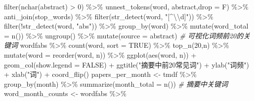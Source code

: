 \documentclass[]{tufte-book}
\newenvironment{Shaded}{}{}
\newcommand{\AttributeTok}[1]{\textcolor[rgb]{0.49,0.56,0.16}{#1}}
\newcommand{\CommentTok}[1]{\textcolor[rgb]{0.38,0.63,0.69}{\textit{#1}}}
\newcommand{\ConstantTok}[1]{\textcolor[rgb]{0.53,0.00,0.00}{#1}}
\newcommand{\DecValTok}[1]{\textcolor[rgb]{0.25,0.63,0.44}{#1}}
\newcommand{\FunctionTok}[1]{\textcolor[rgb]{0.02,0.16,0.49}{#1}}
\newcommand{\NormalTok}[1]{#1}
\newcommand{\OtherTok}[1]{\textcolor[rgb]{0.00,0.44,0.13}{#1}}
\newcommand{\SpecialCharTok}[1]{\textcolor[rgb]{0.25,0.44,0.63}{#1}}
\newcommand{\StringTok}[1]{\textcolor[rgb]{0.25,0.44,0.63}{#1}}
\begin{document}
\begin{Shaded}
\begin{Highlighting}[]
        \FunctionTok{filter}\NormalTok{(}\FunctionTok{nchar}\NormalTok{(abstract) }\SpecialCharTok{\textgreater{}} \DecValTok{0}\NormalTok{) }\SpecialCharTok{\%\textgreater{}\%}
        \FunctionTok{unnest\_tokens}\NormalTok{(word, abstract,}\AttributeTok{drop =}\NormalTok{ F) }\SpecialCharTok{\%\textgreater{}\%}
        \FunctionTok{anti\_join}\NormalTok{(stop\_words) }\SpecialCharTok{\%\textgreater{}\%}
        \FunctionTok{filter}\NormalTok{(}\FunctionTok{str\_detect}\NormalTok{(word, }\StringTok{"[\^{}}\SpecialCharTok{\textbackslash{}\textbackslash{}}\StringTok{d]"}\NormalTok{)) }\SpecialCharTok{\%\textgreater{}\%}
        \FunctionTok{filter}\NormalTok{(}\SpecialCharTok{!}\FunctionTok{str\_detect}\NormalTok{(word, }\StringTok{"abs"}\NormalTok{)) }\SpecialCharTok{\%\textgreater{}\%}
        \FunctionTok{group\_by}\NormalTok{(word) }\SpecialCharTok{\%\textgreater{}\%}
        \FunctionTok{mutate}\NormalTok{(}\AttributeTok{word\_total =} \FunctionTok{n}\NormalTok{()) }\SpecialCharTok{\%\textgreater{}\%}
        \FunctionTok{ungroup}\NormalTok{() }\SpecialCharTok{\%\textgreater{}\%}
        \FunctionTok{mutate}\NormalTok{(}\AttributeTok{source =} \StringTok{\textquotesingle{}abstract\textquotesingle{}}\NormalTok{)}
\CommentTok{\# 可视化词频前20的关键词}
\NormalTok{wordfabs }\SpecialCharTok{\%\textgreater{}\%}
        \FunctionTok{count}\NormalTok{(word, }\AttributeTok{sort =} \ConstantTok{TRUE}\NormalTok{) }\SpecialCharTok{\%\textgreater{}\%}
        \FunctionTok{top\_n}\NormalTok{(}\DecValTok{20}\NormalTok{,n) }\SpecialCharTok{\%\textgreater{}\%}
        \FunctionTok{mutate}\NormalTok{(}\AttributeTok{word =} \FunctionTok{reorder}\NormalTok{(word, n)) }\SpecialCharTok{\%\textgreater{}\%}
        \FunctionTok{ggplot}\NormalTok{(}\FunctionTok{aes}\NormalTok{(word, n)) }\SpecialCharTok{+}
  \FunctionTok{geom\_col}\NormalTok{(}\AttributeTok{show.legend =} \ConstantTok{FALSE}\NormalTok{) }\SpecialCharTok{+}
  \FunctionTok{ggtitle}\NormalTok{(}\StringTok{"摘要中前20常见词"}\NormalTok{) }\SpecialCharTok{+}
  \FunctionTok{ylab}\NormalTok{(}\StringTok{"词频"}\NormalTok{) }\SpecialCharTok{+}
  \FunctionTok{xlab}\NormalTok{(}\StringTok{"词"}\NormalTok{) }\SpecialCharTok{+}
  \FunctionTok{coord\_flip}\NormalTok{()}
\NormalTok{papers\_per\_month }\OtherTok{\textless{}{-}}\NormalTok{ tmdf }\SpecialCharTok{\%\textgreater{}\%}
  \FunctionTok{group\_by}\NormalTok{(month) }\SpecialCharTok{\%\textgreater{}\%}
  \FunctionTok{summarize}\NormalTok{(}\AttributeTok{month\_total =} \FunctionTok{n}\NormalTok{())}
\CommentTok{\# 摘要中关键词}
\NormalTok{word\_month\_counts }\OtherTok{\textless{}{-}}\NormalTok{ wordfabs }\SpecialCharTok{\%\textgreater{}\%}

\end{Highlighting}
\end{Shaded}
\end{document}
